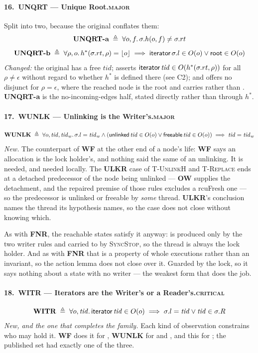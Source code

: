 \paragraph{16.\ UNQRT --- Unique Root.\hfill\textsc{major}}
Split into two, because the original conflates them:
\[
\textbf{UNQRT-a} \;\triangleq\; \forall o,f \ldotp \sigma.h(o,f) \neq \sigma.rt
\]
\[
\textbf{UNQRT-b} \;\triangleq\; \forall \rho,o \ldotp h^{*}(\sigma.rt,\rho) = \lfloor o \rfloor
  \implies \textsf{iterator}\,\sigma.l \in O(o) \lor \textsf{root} \in O(o)
\]
\emph{Changed:} the original has a free $\mathit{tid}$; asserts
$\textsf{iterator}\,\mathit{tid} \in O(h^{*}(\sigma.rt,\rho))$ for all $\rho \neq \epsilon$
without regard to whether $h^{*}$ is defined there (see C2); and offers no
disjunct for $\rho = \epsilon$, where the reached node is the root and carries
\rt{} rather than \itr.  \textbf{UNQRT-a} is the no-incoming-edges half, stated
directly rather than through $h^{*}$.

\paragraph{17.\ WUNLK --- Unlinking is the Writer's.\hfill\textsc{major}}
\[
\textbf{WUNLK} \;\triangleq\; \forall o,\mathit{tid},\mathit{tid}_w \ldotp
  \sigma.l = \mathit{tid}_w \land
  (\textsf{unlinked}\,\mathit{tid} \in O(o) \lor \textsf{freeable}\,\mathit{tid} \in O(o))
  \implies \mathit{tid} = \mathit{tid}_w
\]
\emph{New.}  The counterpart of \textbf{WF} at the other end of a node's life:
\textbf{WF} says an allocation is the lock holder's, and nothing said the same
of an unlinking.  It is needed, and needed locally.  The \textbf{ULKR} case of
\textsc{T-UnlinkH} and \textsc{T-Replace} ends at a detached predecessor of the
node being unlinked --- \textbf{OW} supplies the detachment, and the repaired
premise of those rules excludes a \textsf{rcuFresh} one --- so the predecessor
is unlinked or freeable by \emph{some} thread.  \textbf{ULKR}'s conclusion names
the thread its hypothesis names, so the case does not close without knowing
which.

As with \textbf{FNR}, the reachable states satisfy it anyway: \unlk{} is
produced only by the two writer rules and carried to \frbl{} by
\textsc{SyncStop}, so the thread is always the lock holder.  And as with
\textbf{FNR} that is a property of whole executions rather than an invariant, so
the action lemma does not close over it.  Guarded by the lock, so it says
nothing about a state with no writer --- the weakest form that does the job.

\paragraph{18.\ WITR --- Iterators are the Writer's or a Reader's.\hfill\textsc{critical}}
\[
\textbf{WITR} \;\triangleq\; \forall o,\mathit{tid} \ldotp
  \textsf{iterator}\,\mathit{tid} \in O(o) \implies
  \sigma.l = \mathit{tid} \lor \mathit{tid} \in \sigma.R
\]
\emph{New, and the one that completes the family.}  Each kind of observation
constrains who may hold it.  \textbf{WF} does it for \frsh{}, \textbf{WUNLK}
for \unlk{} and \frbl{}, and this for \itr{}; the published set had exactly one
of the three.

